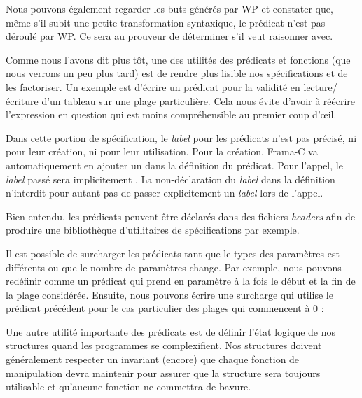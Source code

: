 


Nous pouvons également regarder les buts générés par WP et constater que,
même s'il subit une petite transformation syntaxique, le prédicat n'est pas
déroulé par WP. Ce sera au prouveur de déterminer s'il veut raisonner avec.




Comme nous l'avons dit plus tôt, une des utilités des prédicats et fonctions (que
nous verrons un peu plus tard) est de rendre plus lisible nos spécifications et
de les factoriser. Un exemple est d'écrire un prédicat pour la validité en
lecture/écriture d'un tableau sur une plage particulière. Cela nous évite d'avoir
à réécrire l'expression en question qui est moins compréhensible au premier
coup d’œil.






Dans cette portion de spécification, le \textit{label} pour les prédicats n'est pas
précisé, ni pour leur création, ni pour leur utilisation. Pour la création,
Frama-C va automatiquement en ajouter un dans la définition du prédicat.
Pour l'appel, le \textit{label} passé sera implicitement . La non-déclaration
du \textit{label} dans la définition n'interdit pour autant pas de passer explicitement
un \textit{label} lors de l'appel.



Bien entendu, les prédicats peuvent être déclarés dans des fichiers \textit{headers} afin
de produire une bibliothèque d'utilitaires de spécifications par exemple.



Il est possible de surcharger les prédicats tant que le types des paramètres
est différents ou que le nombre de paramètres change. Par exemple, nous
pouvons redéfinir  comme un prédicat qui prend
en paramètre à la fois le début et la fin de la plage considérée. Ensuite,
nous pouvons écrire une surcharge qui utilise le prédicat précédent pour le
cas particulier des plages qui commencent à 0 :







Une autre utilité importante des prédicats est de définir l'état logique de nos
structures quand les programmes se complexifient. Nos structures doivent
généralement respecter un invariant (encore) que chaque fonction de manipulation
devra maintenir pour assurer que la structure sera toujours utilisable et
qu'aucune fonction ne commettra de bavure.




